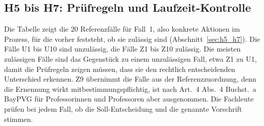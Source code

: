 \subsection{H5 bis H7: Prüfregeln und Laufzeit-Kontrolle}
Die Tabelle zeigt die 20 Referenzfälle für Fall~1, also konkrete Aktionen im Prozess, für die vorher feststeht, ob sie zulässig sind (Abschnitt~\ref{sec:h5_h7}).
Die Fälle U1 bis U10 sind unzulässig, die Fälle Z1 bis Z10 zulässig.
Die meisten zulässigen Fälle sind das Gegenstück zu einem unzulässigen Fall, etwa Z1 zu U1, damit die Prüfregeln zeigen müssen, dass sie den rechtlich entscheidenden Unterschied erkennen.
Z9 übernimmt die Falle aus der Referenzzuordnung, denn die Ernennung wirkt mitbestimmungspflichtig, ist nach Art.~4 Abs.~4 Buchst.~a BayPVG für Professorinnen und Professoren aber ausgenommen.
Die Fachleute prüfen bei jedem Fall, ob die Soll-Entscheidung und die genannte Vorschrift stimmen.
